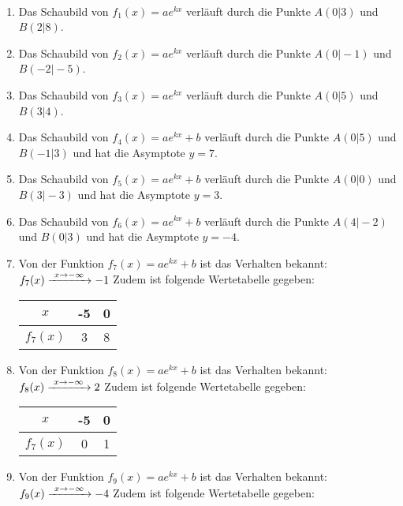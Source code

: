 \begin{minipage}{\textwidth}
	\begin{Exercise}[title={Stelle jeweils eine Funktionsgleichung vom passenden Typ auf}, label=eFktFGlAA1]\\
		\begin{minipage}[t][30cm][t]{0.49\textwidth}
			\begin{enumerate}[label=\alph*)]
				\item Das Schaubild von \(f_1(x)=ae^{kx}\) verläuft durch die Punkte \(A(0\vert3)\) und \(B(2\vert8)\).
				\item Das Schaubild von \(f_2(x)=ae^{kx}\) verläuft durch die Punkte \(A(0\vert-1)\) und \(B(-2\vert-5)\).
				\item Das Schaubild von \(f_3(x)=ae^{kx}\) verläuft durch die Punkte \(A(0\vert5)\) und \(B(3\vert4)\).
				\item Das Schaubild von \(f_4(x)=ae^{kx}+b\) verläuft durch die Punkte \(A(0\vert5)\) und \(B(-1\vert3)\) und hat die Asymptote \(y=7\).
				\item Das Schaubild von \(f_5(x)=ae^{kx}+b\) verläuft durch die Punkte \(A(0\vert0)\) und \(B(3\vert-3)\) und hat die Asymptote \(y=3\).
				\item Das Schaubild von \(f_6(x)=ae^{kx}+b\) verläuft durch die Punkte \(A(4\vert-2)\) und \(B(0\vert3)\) und hat die Asymptote \(y=-4\).
				\item Von der Funktion \(f_7(x)=ae^{kx}+b\) ist das Verhalten bekannt: \(f_7(x)\xrightarrow{\hphantom{\ }x\to-\infty\hphantom{\ }}-1\) Zudem ist folgende Wertetabelle gegeben:\\
				\begin{tabular}{c|cc}
					\(x\)&-5&0\\
					\hline
					\(f_7(x)\)&3&8\\
				\end{tabular}
				\item Von der Funktion \(f_8(x)=ae^{kx}+b\) ist das Verhalten bekannt: \(f_8(x)\xrightarrow{\hphantom{\ }x\to-\infty\hphantom{\ }}2\) Zudem ist folgende Wertetabelle gegeben:\\
				\begin{tabular}{c|cc}
					\(x\)&-5&0\\
					\hline
					\(f_7(x)\)&0&1\\
				\end{tabular}
				\item Von der Funktion \(f_9(x)=ae^{kx}+b\) ist das Verhalten bekannt: \(f_9(x)\xrightarrow{\hphantom{\ }x\to-\infty\hphantom{\ }}-4\) Zudem ist folgende Wertetabelle gegeben:\\

\end{enumerate}
\end{minipage}
\end{Exercise}
\end{minipage}
